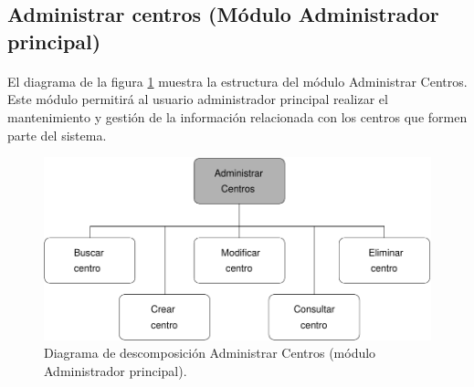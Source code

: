\subsection{Administrar centros (Módulo Administrador principal)}

  \paragraph{}El diagrama de la figura
  \ref{diagramaDescomposicionAdministrarCentros} muestra la estructura del módulo
  Administrar Centros. Este módulo permitirá al usuario administrador principal
  realizar el mantenimiento y gestión de la información relacionada con los
  centros que formen parte del sistema.


  \begin{figure}[!ht]
    \begin{center}
      \includegraphics[]{11.Disenyo_Arquitectonico/11.2.Diagramas_Descomposicion/11.2.2.Modulo_administrador_principal/AdministrarBBDD/AdministrarCentros/Diagramas/administrar_centros.pdf}
      \caption{Diagrama de descomposición Administrar Centros (módulo Administrador principal).}
      \label{diagramaDescomposicionAdministrarCentros}
    \end{center}
  \end{figure}
